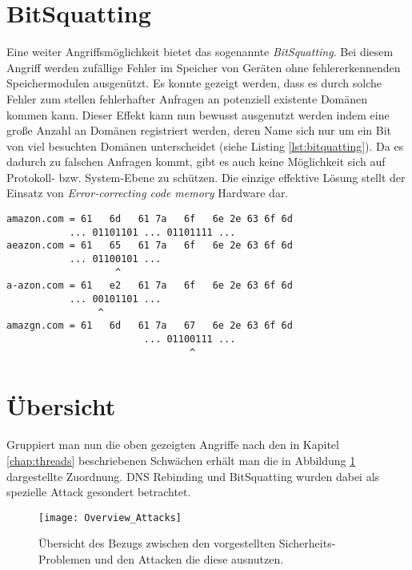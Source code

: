 \section{BitSquatting}
Eine weiter Angriffsmöglichkeit bietet das sogenannte \textit{BitSquatting}. Bei diesem Angriff werden zufällige Fehler im Speicher von Geräten ohne fehlererkennenden Speichermodulen ausgenützt. Es konnte gezeigt werden, dass es durch solche Fehler zum stellen fehlerhafter Anfragen an potenziell existente Domänen kommen kann\cite{Dinaburg2011}. Dieser Effekt kann nun bewusst ausgenutzt werden indem eine große Anzahl an Domänen registriert werden, deren Name sich nur um ein Bit von viel besuchten Domänen unterscheidet (siehe Listing \ref{lst:bitquatting}). Da es dadurch zu falschen Anfragen kommt, gibt es auch keine Möglichkeit sich auf Protokoll- bzw. System-Ebene zu schützen. Die einzige effektive Lösung stellt der Einsatz von \textit{Error-correcting code memory} Hardware dar.  
\begin{lstlisting}[caption={Drei mögliche BitSquatting-Domänen für die Zieldomäne \texttt{amazon.com}}, label={lst:bitquatting}]
amazon.com = 61   6d   61 7a   6f   6e 2e 63 6f 6d
           ... 01101101 ... 01101111 ... 
aeazon.com = 61   65   61 7a   6f   6e 2e 63 6f 6d  
           ... 01100101 ...
                   ^
a-azon.com = 61   e2   61 7a   6f   6e 2e 63 6f 6d 
           ... 00101101 ...
                ^
amazgn.com = 61   6d   61 7a   67   6e 2e 63 6f 6d
                        ... 01100111 ...
                                ^
\end{lstlisting}

\section{Übersicht}

Gruppiert man nun die oben gezeigten Angriffe nach den in Kapitel \ref{chap:threads} beschriebenen Schwächen erhält man die in Abbildung \ref{img:attacks-summary} dargestellte Zuordnung. DNS Rebinding und BitSquatting wurden dabei als spezielle Attack gesondert betrachtet.

\begin{figure}[!hb]
    \centering
    \texttt{[image: Overview\_Attacks]}
    \caption{Übersicht des Bezugs zwischen den vorgestellten Sicherheits-Problemen und den Attacken die diese ausnutzen.}
    \label{img:attacks-summary}
\end{figure}


